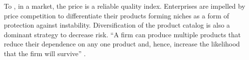 \documentclass[a4paper, 12pt, openright, oneside, german, french, brazil, english]{abntex2}
\begin{document}
	
	
	To , in a market, the price is a reliable quality index. Enterprises are impelled by price competition to differentiate their products forming niches as a form of protection against instability. Diversification of the product catalog is also a dominant strategy to decrease risk. ``A firm can produce multiple products that reduce their dependence on any one product and, hence, increase the likelihood that the firm will survive'' . 
	
	
\end{document}
